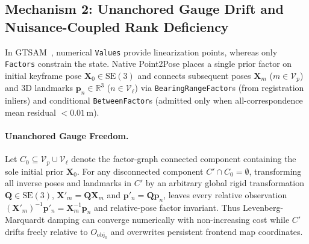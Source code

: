 \documentclass{evidencescene}
\begin{document}
\subsection{Mechanism 2: Unanchored Gauge Drift and Nuisance-Coupled Rank Deficiency}
In GTSAM~\cite{gtsam}, numerical \texttt{Values} provide linearization points, whereas only \texttt{Factors} constrain the state. Native Point2Pose places a single prior factor on initial keyframe pose $\mathbf{X}_0\in\mathrm{SE}(3)$ and connects subsequent poses $\mathbf{X}_m$ ($m\in\mathcal{V}_p$) and 3D landmarks $\mathbf{p}_n\in\mathbb{R}^3$ ($n\in\mathcal{V}_\ell$) via \texttt{BearingRangeFactor}s (from registration inliers) and conditional \texttt{BetweenFactor}s (admitted only when all-correspondence mean residual $<0.01\,\mathrm{m}$).

\paragraph{Unanchored Gauge Freedom.} Let $C_0\subseteq\mathcal{V}_p\cup\mathcal{V}_\ell$ denote the factor-graph connected component containing the sole initial prior $\mathbf{X}_0$. For any disconnected component $C'\cap C_0=\emptyset$, transforming all inverse poses and landmarks in $C'$ by an arbitrary global rigid transformation $\mathbf{Q}\in\mathrm{SE}(3)$, $\mathbf{X}'_m=\mathbf{Q}\mathbf{X}_m$ and $\mathbf{p}'_n=\mathbf{Q}\mathbf{p}_n$, leaves every relative observation $(\mathbf{X}'_m)^{-1}\mathbf{p}'_n=\mathbf{X}_m^{-1}\mathbf{p}_n$ and relative-pose factor invariant. Thus Levenberg-Marquardt damping can converge numerically with non-increasing cost while $C'$ drifts freely relative to $O_{\mathrm{obj}_0}$ and overwrites persistent frontend map coordinates.
\end{document}

